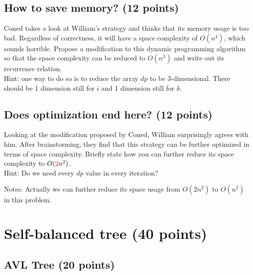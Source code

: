 \documentclass[11pt]{exam}
\begin{document}
\subsection{How to save memory? (12 points)}
Coned takes a look at William's strategy and thinks that its memory usage is too bad. Regardless of correctness, it will have a space complexity of $O(n^4)$, which sounds horrible. Propose a modification to this dynamic programming algorithm so that the space complexity can be reduced to $O(n^3)$ and write out its recurrence relation.\\
Hint: one way to do so is to reduce the array $dp$ to be 3-dimensional. There should be 1 dimension still for $i$ and 1 dimension still for $k$.
\begin{solution}
\end{solution}
\subsection{Does optimization end here? (12 points)}
Looking at the modification proposed by Coned, William surprisingly agrees with him. After brainstorming, they find that this strategy can be further optimized in terms of space complexity. Briefly state how you can further reduce its space complexity to $O({\color{red}2}n^2)$.\\
Hint: Do we need every $dp$ value in every iteration?
\begin{solution}
\end{solution}
Notes: Actually we can further reduce its space usage from $O(2n^2)$ to $O(n^2)$ in this problem.
\newpage
\section{Self-balanced tree (40 points)}
\subsection{AVL Tree (20 points)}
\end{document}

